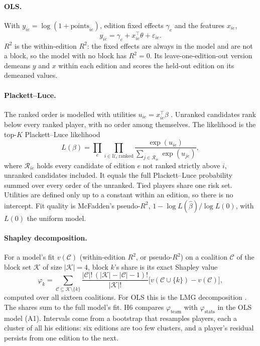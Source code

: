 \documentclass[11pt,a4paper]{article}
\begin{document}
\paragraph{OLS.}
With $y_{ie} = \log(1 + \text{points}_{ie})$, edition fixed effects $\gamma_e$ and
the features $x_{ie}$,
\begin{equation}
  y_{ie} = \gamma_e + x_{ie}^\top \theta + \varepsilon_{ie}.
  \label{eq:ols}
\end{equation}
$R^2$ is the within-edition $R^2$: the fixed effects are always in the model and
are not a block, so the model with no block has $R^2 = 0$. Its
leave-one-edition-out version demeans $y$ and $x$ within each edition and scores
the held-out edition on its demeaned values.

\paragraph{Plackett--Luce.}
The ranked order is modelled with utilities $u_{ie} = x_{ie}^\top \beta$
\citep{plackett1975permutations,luce1959choice,hunter2004mm}. Unranked
candidates rank below every ranked player, with no order among themselves.
The likelihood is the top-$K$ Plackett--Luce likelihood
\begin{equation}
  L(\beta) = \prod_e \prod_{i \in \mathcal U_e\ \text{ranked}}
  \frac{\exp(u_{ie})}{\sum_{j \in \mathcal R_{ie}} \exp(u_{je})},
  \label{eq:pl}
\end{equation}
where $\mathcal R_{ie}$ holds every candidate of edition $e$ not ranked strictly
above $i$, unranked candidates included. It equals the full Plackett--Luce
probability summed over every order of the unranked. Tied players share one
risk set. Utilities are defined only up to a constant within an edition, so
there is no intercept. Fit quality is McFadden's pseudo-$R^2$,
$1 - \log L(\hat\beta) / \log L(0)$, with $L(0)$ the uniform model.

\paragraph{Shapley decomposition.}
For a model's fit $v(\mathcal C)$ (within-edition $R^2$, or pseudo-$R^2$) on a
coalition $\mathcal C$ of the block set $\mathcal K$ of size $|\mathcal K| = 4$,
block $k$'s share is its exact Shapley value \citep{shapley1953value}
\begin{equation}
  \varphi_k = \sum_{\mathcal C \subseteq \mathcal K \setminus \{k\}}
  \frac{|\mathcal C|!\,(|\mathcal K| - |\mathcal C| - 1)!}{|\mathcal K|!}
  \big[v(\mathcal C \cup \{k\}) - v(\mathcal C)\big],
  \label{eq:shapley}
\end{equation}
computed over all sixteen coalitions. For OLS this is the LMG decomposition
\citep{lindeman1980multivariate,gromping2007relimp}. The shares sum to the full
model's fit. H6 compares $\varphi_{\text{team}}$ with $\varphi_{\text{stats}}$
in the OLS model (A1). Intervals come from a bootstrap that resamples players,
each a cluster of all his editions: six editions are too few clusters, and a
player's residual persists from one edition to the next.
\end{document}
